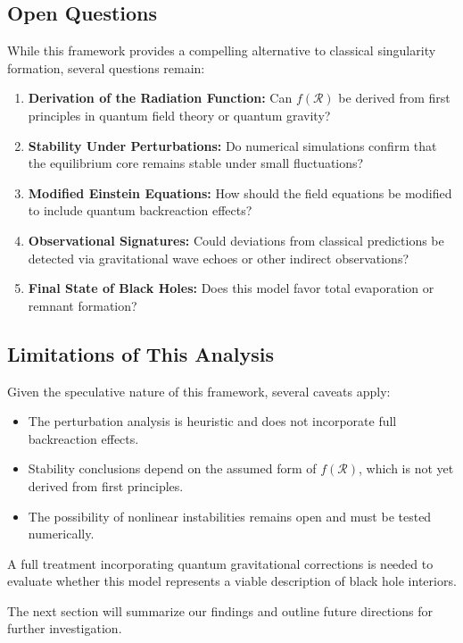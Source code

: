 \subsection{Open Questions}
While this framework provides a compelling alternative to classical singularity formation, several questions remain:
\begin{enumerate}
    \item \textbf{Derivation of the Radiation Function:} Can \( f(\mathcal{R}) \) be derived from first principles in quantum field theory or quantum gravity?
    \item \textbf{Stability Under Perturbations:} Do numerical simulations confirm that the equilibrium core remains stable under small fluctuations?
    \item \textbf{Modified Einstein Equations:} How should the field equations be modified to include quantum backreaction effects?
    \item \textbf{Observational Signatures:} Could deviations from classical predictions be detected via gravitational wave echoes or other indirect observations?
    \item \textbf{Final State of Black Holes:} Does this model favor total evaporation or remnant formation?
\end{enumerate}

\subsection{Limitations of This Analysis}
Given the speculative nature of this framework, several caveats apply:
\begin{itemize}
    \item The perturbation analysis is heuristic and does not incorporate full backreaction effects.
    \item Stability conclusions depend on the assumed form of \( f(\mathcal{R}) \), which is not yet derived from first principles.
    \item The possibility of nonlinear instabilities remains open and must be tested numerically.
\end{itemize}

A full treatment incorporating quantum gravitational corrections is needed to evaluate whether this model represents a viable description of black hole interiors.

The next section will summarize our findings and outline future directions for further investigation.
